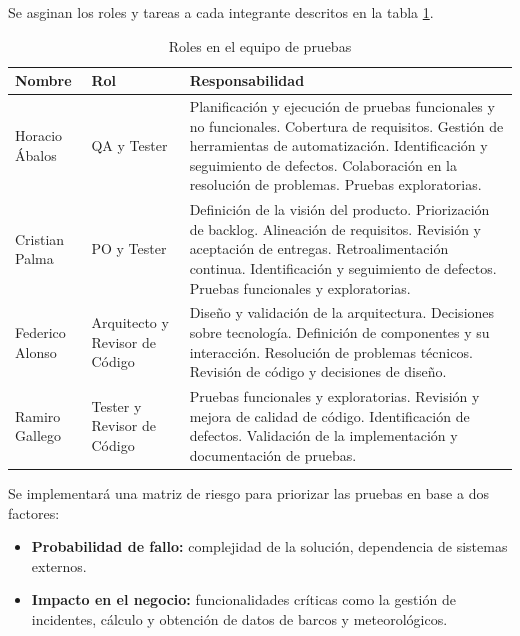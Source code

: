 Se asginan los roles y tareas a cada integrante descritos en la tabla \ref{tab:rolesPruebas}.

\begin{table}[H]
    \centering
    \begin{tabular}{p{3cm} p{3cm} p{8cm}}
    \hline
    \rowcolor[HTML]{C0C0C0} 
    \textbf{Nombre} & \textbf{Rol} & \textbf{Responsabilidad}                                                                                     \\ \hline
    Horacio Ábalos & QA y Tester & Planificación y ejecución de pruebas funcionales y no funcionales. Cobertura de requisitos. Gestión de herramientas de automatización. Identificación y seguimiento de defectos. Colaboración en la resolución de problemas. Pruebas exploratorias. \\ \hline
    Cristian Palma & PO y Tester & Definición de la visión del producto. Priorización de backlog. Alineación de requisitos. Revisión y aceptación de entregas. Retroalimentación continua. Identificación y seguimiento de defectos. Pruebas funcionales y exploratorias. \\ \hline
    Federico Alonso & Arquitecto y Revisor de Código & Diseño y validación de la arquitectura. Decisiones sobre tecnología. Definición de componentes y su interacción. Resolución de problemas técnicos. Revisión de código y decisiones de diseño. \\ \hline
    Ramiro Gallego & Tester y Revisor de Código & Pruebas funcionales y exploratorias. Revisión y mejora de calidad de código. Identificación de defectos. Validación de la implementación y documentación de pruebas. \\ \hline
    \end{tabular}
    \caption{Roles en el equipo de pruebas}
    \label{tab:rolesPruebas}
\end{table}



Se implementará una matriz de riesgo para priorizar las pruebas en base a dos factores:

\begin{itemize}
    \item \textbf{Probabilidad de fallo:} complejidad de la solución, dependencia de sistemas externos.
    \item \textbf{Impacto en el negocio:} funcionalidades críticas como la gestión de incidentes, cálculo y 
    obtención de datos de barcos y meteorológicos.
\end{itemize}

